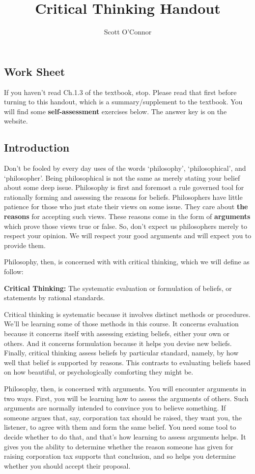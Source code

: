 \documentclass[]{article}
\title{Critical Thinking Handout}
\author{Scott O'Connor}
\date{}
\begin{document}
\maketitle

\subsection{Work Sheet}\label{work-sheet}

If you haven't read Ch.1.3 of the textbook, stop. Please read that first
before turning to this handout, which is a summary/supplement to the
textbook. You will find some \textbf{self-assessment} exercises below.
The answer key is on the website.

\subsection{Introduction}\label{introduction}

Don't be fooled by every day uses of the words `philosophy',
`philosophical', and `philosopher'. Being philosophical is not the same
as merely stating your belief about some deep issue. Philosophy is first
and foremost a rule governed tool for rationally forming and assessing
the reasons for beliefs. Philosophers have little patience for those who
just state their views on some issue. They care about \textbf{the
reasons} for accepting such views. These reasons come in the form of
\textbf{arguments} which prove those views true or false. So, don't
expect us philosophers merely to respect your opinion. We will respect
your good arguments and will expect you to provide them.

Philosophy, then, is concerned with with critical thinking, which we
will define as follow:

\textbf{Critical Thinking:} The systematic evaluation or formulation of
beliefs, or statements by rational standards.

Critical thinking is systematic because it involves distinct methods or
procedures. We'll be learning some of those methods in this course. It
concerns evaluation because it concerns itself with assessing existing
beliefs, either your own or others. And it concerns formulation because
it helps you devise new beliefs. Finally, critical thinking assess
beliefs by particular standard, namely, by how well that belief is
supported by reasons. This contrasts to evaluating beliefs based on how
beautiful, or psychologically comforting they might be.

Philosophy, then, is concerned with arguments. You will encounter
arguments in two ways. First, you will be learning how to assess the
arguments of others. Such arguments are normally intended to convince
you to believe something. If someone argues that, say, corporation tax
should be raised, they want you, the listener, to agree with them and
form the same belief. You need some tool to decide whether to do that,
and that's how learning to assess arguments helps. It gives you the
ability to determine whether the reason someone has given for raising
corporation tax supports that conclusion, and so helps you determine
whether you should accept their proposal.
\end{document}
